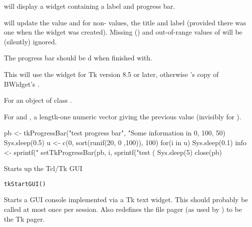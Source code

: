 %
\begin{Details}\relax
{} will display a widget containing a label and
progress bar.

 will update the value and for non-
values, the title and label (provided there was one when the widget
was created).  Missing () and out-of-range values of
 will be (silently) ignored.

The progress bar should be d when finished with.

This will use the  widget for Tk version 8.5 or
later, otherwise \R{}'s copy of BWidget's .
\end{Details}
%
\begin{Value}
For  an object of class .

For  and , a
length-one numeric vector giving the previous value (invisibly for
).
\end{Value}
%
\begin{SeeAlso}\relax
{}  
\end{SeeAlso}
%
\begin{Examples}
\begin{ExampleCode}

pb <- tkProgressBar("test progress bar", "Some information in %
                    0, 100, 50)
Sys.sleep(0.5)
u <- c(0, sort(runif(20, 0 ,100)), 100)
for(i in u) {
    Sys.sleep(0.1)
    info <- sprintf("%
    setTkProgressBar(pb, i, sprintf("test (%
}
Sys.sleep(5)
close(pb)
\end{ExampleCode}
\end{Examples}
%
\begin{Description}\relax
Starts up the Tcl/Tk GUI
\end{Description}
%
\begin{Usage}
\begin{verbatim}
tkStartGUI()
\end{verbatim}
\end{Usage}
%
\begin{Details}\relax
Starts a GUI console implemented via a Tk text widget. This should
probably be called at most once per session. Also redefines the file
pager (as used by ) to be the Tk pager. 
\end{Details}
